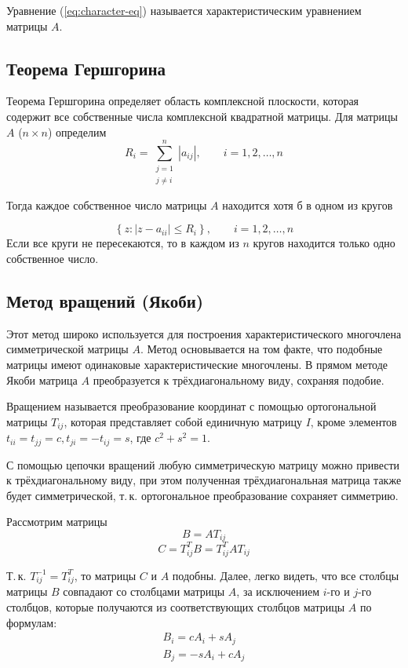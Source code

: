 \documentclass[a4paper,12pt,notitlepage,pdftex,headsepline]{scrartcl}
\begin{document}
Уравнение (\ref{eq:character-eq}) называется характеристическим уравнением матрицы $A$.
\subsection{Теорема Гершгорина}
\label{ss:gershgorin}
Теорема Гершгорина определяет область комплексной плоскости, которая содержит все собственные числа комплексной квадратной матрицы.
Для матрицы $A$ ($n\times n$) определим 
$$R_i = \sum\limits_{\substack{
j = 1\\
j \neq i
}
}^n \left| a_{ij} \right|,\qquad i = 1, 2, \dots, n$$

Тогда каждое собственное число матрицы $A$ находится хотя б в одном из кругов

$$\left\{  z: \left| z - a_{ii}\right| \leqslant R_i \right\}, \qquad i = 1, 2, \dots, n$$
Если все круги не пересекаются, то в каждом из $n$ кругов находится только одно собственное число. 

\subsection{Метод вращений (Якоби)}
\label{ss:jacobi}
Этот метод широко используется для построения характеристического многочлена симметрической матрицы $A$.
Метод основывается на том факте, что подобные матрицы имеют одинаковые характеристические многочлены.
В прямом методе Якоби матрица $A$ преобразуется к трёхдиагональному виду, сохраняя подобие.

Вращением называется преобразование координат с помощью ортогональной матрицы $T_{ij}$, которая представляет собой единичную матрицу $I$, кроме элементов $t_{ii} = t_{jj} = c, t_{ji} = -t_{ij} = s$, где $c^2 + s^2 = 1$.

С помощью цепочки вращений любую симметрическую матрицу можно привести к трёхдиагональному виду, при этом полученная трёхдиагональная матрица также будет симметрической, т.\,к. ортогональное преобразование сохраняет симметрию.

Рассмотрим матрицы $$B = A T_{ij}$$
$$C = T_{ij}^T B = T_{ij}^T A T_{ij}$$

Т.\,к. $T_{ij}^{-1} = T_{ij}^T$, то матрицы $C$ и $A$ подобны.
Далее, легко видеть, что все столбцы матрицы $B$ совпадают со столбцами матрицы $A$, за исключением $i$-го и $j$-го столбцов, которые получаются из соответствующих столбцов матрицы $A$ по формулам:
\begin{eqnarray}
\label{eq:b_ij_from_a_ij}
B_i = c A_i + s A_j\\
B_j = -s A_i + c A_j
\end{eqnarray}
\end{document}
